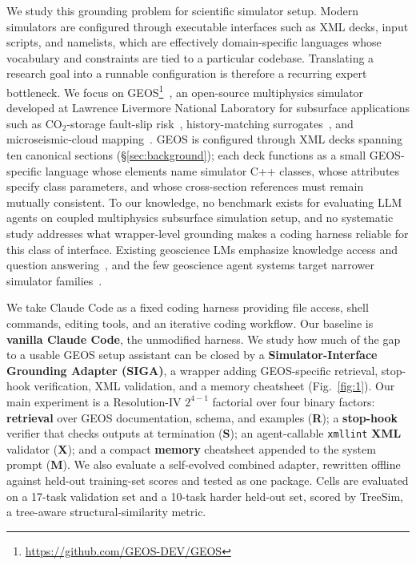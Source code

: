 \documentclass{article}
\begin{document}
We study this grounding problem for scientific simulator setup. Modern simulators are configured through executable interfaces such as XML decks, input scripts, and namelists, which are effectively domain-specific languages whose vocabulary and constraints are tied to a particular codebase. Translating a research goal into a runnable configuration is therefore a recurring expert bottleneck. We focus on GEOS\footnote{\url{https://github.com/GEOS-DEV/GEOS}}~\citep{geos2024}, an open-source multiphysics simulator developed at Lawrence Livermore National Laboratory for subsurface applications such as CO$_2$-storage fault-slip risk~\citep{he2026faultslip}, history-matching surrogates~\citep{han2024accelerated}, and microseismic-cloud mapping~\citep{glubokovskikh2023microseismic}. GEOS is configured through XML decks spanning ten canonical sections (\S\ref{sec:background}); each deck functions as a small GEOS-specific language whose elements name simulator C++ classes, whose attributes specify class parameters, and whose cross-section references must remain mutually consistent. To our knowledge, no benchmark exists for evaluating LLM agents on coupled multiphysics subsurface simulation setup, and no systematic study addresses what wrapper-level grounding makes a coding harness reliable for this class of interface. Existing geoscience LMs emphasize knowledge access and question answering~\citep{deng2023k2,lin2024geogalactica}, and the few geoscience agent systems target narrower simulator families~\citep{bekele2025geosim,li2025seismologyagent,moyner2026jutulgpt}.

We take Claude Code as a fixed coding harness providing file access, shell commands, editing tools, and an iterative coding workflow. Our baseline is \textbf{vanilla Claude Code}, the unmodified harness. We study how much of the gap to a usable GEOS setup assistant can be closed by a \textbf{Simulator-Interface Grounding Adapter (SIGA)}, a wrapper adding GEOS-specific retrieval, stop-hook verification, XML validation, and a memory cheatsheet (Fig.~\ref{fig:1}). Our main experiment is a Resolution-IV $2^{4-1}$ factorial over four binary factors: \textbf{retrieval} over GEOS documentation, schema, and examples (\textbf{R}); a \textbf{stop-hook} verifier that checks outputs at termination (\textbf{S}); an agent-callable \texttt{xmllint} \textbf{XML} validator (\textbf{X}); and a compact \textbf{memory} cheatsheet appended to the system prompt (\textbf{M}). We also evaluate a self-evolved combined adapter, rewritten offline against held-out training-set scores and tested as one package. Cells are evaluated on a 17-task validation set and a 10-task harder held-out set, scored by TreeSim, a tree-aware structural-similarity metric.
\end{document}
